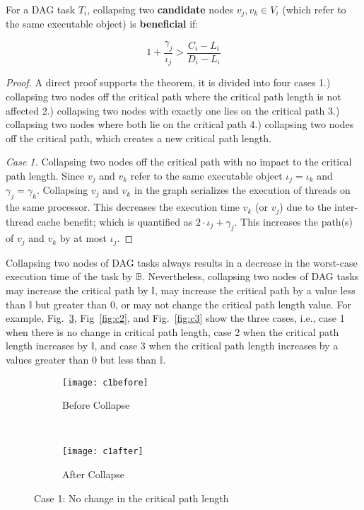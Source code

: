 \begin{theorem}\label{thrm:conditional-collapse} For a DAG task ${T_i}$, collapsing two \textbf{candidate} nodes ${v_j, v_k \in V_i}$ (which refer to the same executable object) is \textbf{beneficial} if:

    \begin{equation}\label{eq:cond}
        1 + \frac{\gamma_j}{\iota_j} > \frac{C_i  - L_i }{D_i - L_i}
    \end{equation}
\end{theorem}
\begin{proof}
A direct proof supports the theorem, it is divided into four cases 1.) collapsing two nodes off the critical path where the critical path length is not affected 2.) collapsing two nodes with exactly one lies on the critical path 3.) collapsing two nodes where both lie on the critical path 4.) collapsing two nodes off the critical path, which creates a new critical path length.

\emph{Case 1.} Collapsing two nodes off the critical path with no impact to the critical path length. Since ${v_j}$ and ${v_k}$ refer to the same executable object ${\iota_j = \iota_k}$ and ${\gamma_j = \gamma_k}$. Collapsing ${v_j}$ and ${v_k}$ in the graph serializes the execution of threads on the same processor. This decreases the execution time ${v_k}$ (or ${v_j}$) due to the inter-thread cache benefit; which is quantified as ${2 \cdot \iota_j + \gamma_j}$. This increases the path(s) of ${v_j}$ and ${v_k}$ by at most ${\iota_j}$. 
\end{proof}

Collapsing two nodes of DAG tasks always results in a decrease in the worst-case execution time of the task by $\mathbb{B}$. Nevertheless, collapsing two nodes of DAG tasks may increase the critical path by $\mathbb{I}$, may increase the critical path by a value less than $\mathbb{I}$ but greater than $0$, or may not change the critical path length value. For example, Fig.~\ref{fig:c1}, Fig~\ref{fig:c2}, and Fig.~\ref{fig:c3} show the three cases, i.e., case 1 when there is no change in critical path length, case 2 when the critical path length increases by $\mathbb{I}$, and case 3 when the critical path length increases by a values greater than $0$ but less than $\mathbb{I}$.

\begin{figure}
  \centering
  \begin{subfigure}[b]{0.4\textwidth}{
      \texttt{[image: c1before]}
      \caption{Before Collapse}
      \label{fig:c1before}
    }
  \end{subfigure}~
  \begin{subfigure}[b]{0.4\textwidth}{
      \texttt{[image: c1after]}
      \caption{After Collapse}
      \label{fig:c1after}
    }
  \end{subfigure}
  \caption{Case 1:  No change in the critical path length}
  \label{fig:c1}
\end{figure}


